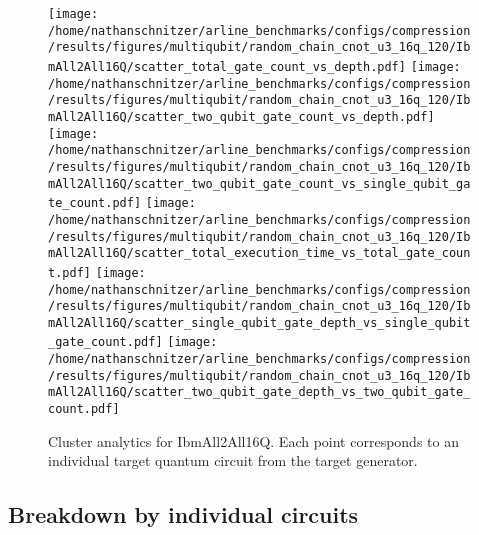 \documentclass{report}%
\begin{document}
\begin{figure}[h!]%
\centering%
\texttt{[image: /home/nathanschnitzer/arline\_benchmarks/configs/compression/results/figures/multiqubit/random\_chain\_cnot\_u3\_16q\_120/IbmAll2All16Q/scatter\_total\_gate\_count\_vs\_depth.pdf]}%
\centering%
\texttt{[image: /home/nathanschnitzer/arline\_benchmarks/configs/compression/results/figures/multiqubit/random\_chain\_cnot\_u3\_16q\_120/IbmAll2All16Q/scatter\_two\_qubit\_gate\_count\_vs\_depth.pdf]}%
\linebreak%
\centering%
\texttt{[image: /home/nathanschnitzer/arline\_benchmarks/configs/compression/results/figures/multiqubit/random\_chain\_cnot\_u3\_16q\_120/IbmAll2All16Q/scatter\_two\_qubit\_gate\_count\_vs\_single\_qubit\_gate\_count.pdf]}%
\centering%
\texttt{[image: /home/nathanschnitzer/arline\_benchmarks/configs/compression/results/figures/multiqubit/random\_chain\_cnot\_u3\_16q\_120/IbmAll2All16Q/scatter\_total\_execution\_time\_vs\_total\_gate\_count.pdf]}%
\linebreak%
\centering%
\texttt{[image: /home/nathanschnitzer/arline\_benchmarks/configs/compression/results/figures/multiqubit/random\_chain\_cnot\_u3\_16q\_120/IbmAll2All16Q/scatter\_single\_qubit\_gate\_depth\_vs\_single\_qubit\_gate\_count.pdf]}%
\centering%
\texttt{[image: /home/nathanschnitzer/arline\_benchmarks/configs/compression/results/figures/multiqubit/random\_chain\_cnot\_u3\_16q\_120/IbmAll2All16Q/scatter\_two\_qubit\_gate\_depth\_vs\_two\_qubit\_gate\_count.pdf]}%
\linebreak%
\caption{Cluster analytics for IbmAll2All16Q. Each point corresponds to an individual target
                    quantum circuit from the target generator.}%
\end{figure}

%
\clearpage%
\subsection*{Breakdown by individual circuits }%
\label{subsec:Breakdownbyindividualcircuits}%

%
\end{document}
